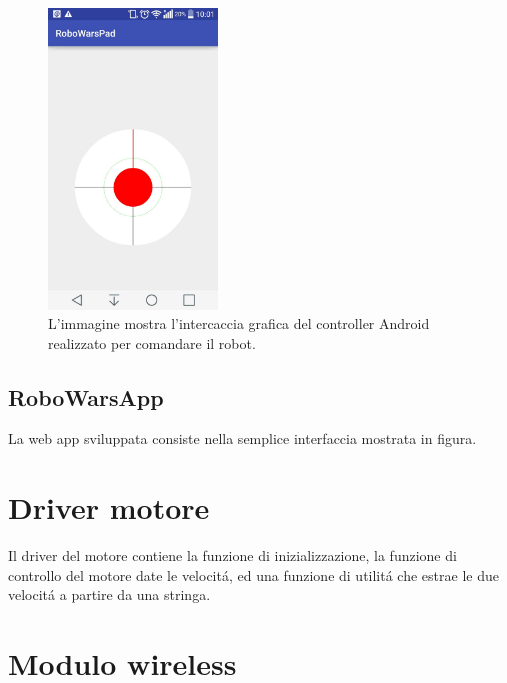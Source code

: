 \documentclass [11pt ,a4paper ,twoside ]{report}
\begin{document}
\begin{figure}
	\centering
		\includegraphics[width=0.4\textwidth]{Images/joy.jpg}
	\caption{L'immagine mostra l'intercaccia grafica del controller Android realizzato per comandare il robot.}
	\label{fig:joy}
\end{figure}

\subsection{RoboWarsApp}
La web app sviluppata consiste nella semplice interfaccia mostrata in figura.

\begin{center}
\end{center}

\section{Driver motore}

Il driver del motore contiene la funzione di inizializzazione, la funzione di controllo del motore date le velocit\'a, ed una funzione di utilit\'a che estrae le due velocit\'a a partire da una stringa.


\section{Modulo wireless}
\end{document}
